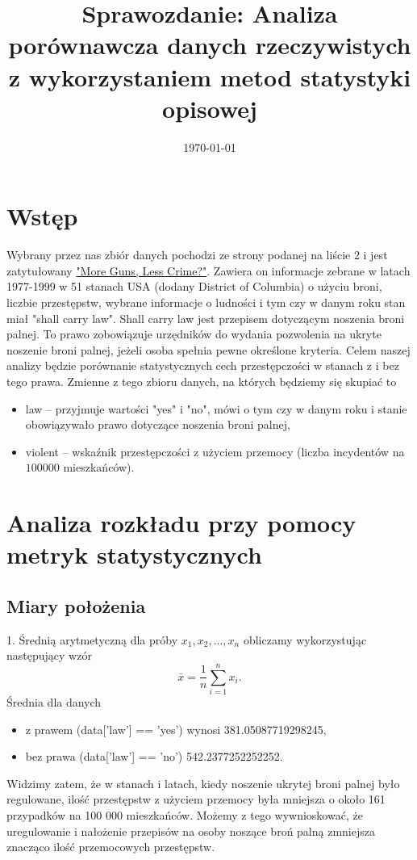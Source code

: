 \documentclass[a4paper,12pt]{article}
\title{Sprawozdanie: Analiza porównawcza danych rzeczywistych z wykorzystaniem metod statystyki opisowej}
\date{\today}
\begin{document}
	\maketitle
	
	{\small \section{Wstęp}}
	Wybrany przez nas zbiór danych pochodzi ze strony podanej na liście 2   i jest zatytułowany \href{https://vincentarelbundock.github.io/Rdatasets/doc/AER/Guns.html}{"More Guns, Less Crime?"}. Zawiera on informacje zebrane w latach 1977-1999 w 51 stanach USA (dodany District of Columbia) o użyciu broni, liczbie przestępstw, wybrane informacje o ludności i tym czy w danym roku stan miał "shall carry law". Shall carry law jest przepisem dotyczącym noszenia broni palnej. To prawo zobowiązuje urzędników do wydania pozwolenia na ukryte noszenie broni palnej, jeżeli osoba spełnia pewne określone kryteria. Celem naszej analizy będzie porównanie statystycznych cech przestępczości w stanach z i bez tego prawa. Zmienne z tego zbioru danych, na których będziemy się skupiać to
	\begin{itemize}[itemsep=5pt,parsep=0pt]
			\item law -- przyjmuje wartości "yes" i "no", mówi o tym czy w danym roku i stanie obowiązywało prawo dotyczące noszenia broni palnej,
			\item violent -- wskaźnik przestępczości z użyciem przemocy (liczba incydentów na $100000$ mieszkańców).
	\end{itemize}
	
	{\small \section{Analiza rozkładu przy pomocy metryk statystycznych}} 
	\subsection{Miary położenia}
	
	1. Średnią arytmetyczną dla próby $x_1, x_2, ..., x_n$ obliczamy wykorzystując następujący wzór
	\begin{equation}
		\bar x = \frac{1}{n} \sum_{i=1}^{n} x_i.
	\end{equation}
	Średnia dla danych
	\begin{itemize}[itemsep=5pt,parsep=0pt]
		\item z prawem (data['law'] == 'yes') wynosi 381.05087719298245,
		\item bez prawa (data['law'] == 'no') 542.2377252252252.
	\end{itemize}
	Widzimy zatem, że w stanach i latach, kiedy noszenie ukrytej broni palnej było regulowane, ilość przestępstw z użyciem przemocy była mniejsza o około 161 przypadków na 100 000 mieszkańców. Możemy z tego wywnioskować, że uregulowanie i nałożenie przepisów na osoby noszące broń palną zmniejsza znacząco ilość przemocowych przestępstw. \\
	
\end{document}
